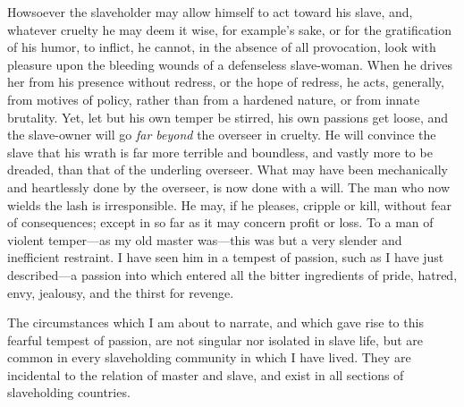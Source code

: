 Howsoever the slaveholder may allow himself to act toward his slave,
and, whatever cruelty he may deem it wise, for example's sake, or for
the gratification of his humor, to inflict, he cannot, in the absence of
all provocation, look with pleasure upon the bleeding wounds of a
defenseless slave-woman. When he drives her from his presence without
redress, or the hope of redress, he acts, generally, from motives of
policy, rather than from a hardened nature, or from innate brutality.
Yet, let but his own temper be stirred, his own passions get loose, and
the slave-owner will go \emph{far beyond} the overseer in cruelty. He
will convince the slave that his wrath is far more terrible and
boundless, and vastly more to be dreaded, than that of the underling
overseer. What may have been {\protect\hypertarget{85}{}{}}mechanically
and heartlessly done by the overseer, is now done with a will. The man
who now wields the lash is irresponsible. He may, if he pleases, cripple
or kill, without fear of consequences; except in so far as it may
concern profit or loss. To a man of violent temper---as my old master
was---this was but a very slender and inefficient restraint. I have seen
him in a tempest of passion, such as I have just described---a passion
into which entered all the bitter ingredients of pride, hatred, envy,
jealousy, and the thirst for revenge.

The circumstances which I am about to narrate, and which gave rise to
this fearful tempest of passion, are not singular nor isolated in slave
life, but are common in every slaveholding community in which I have
lived. They are incidental to the relation of master and slave, and
exist in all sections of slaveholding countries.


